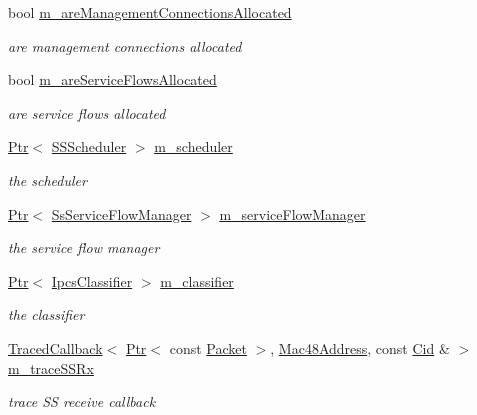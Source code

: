 \begin{DoxyCompactItemize}
bool \hyperlink{classns3_1_1SubscriberStationNetDevice_a601bcf0cd57f6d9f0b112e9c9afc23e7}{m\+\_\+are\+Management\+Connections\+Allocated}
\begin{DoxyCompactList}\small\item\em are management connections allocated \end{DoxyCompactList}\item 
bool \hyperlink{classns3_1_1SubscriberStationNetDevice_aa9526bd72926a0a71e7b066f81de6e22}{m\+\_\+are\+Service\+Flows\+Allocated}
\begin{DoxyCompactList}\small\item\em are service flows allocated \end{DoxyCompactList}\item 
\hyperlink{classns3_1_1Ptr}{Ptr}$<$ \hyperlink{classns3_1_1SSScheduler}{S\+S\+Scheduler} $>$ \hyperlink{classns3_1_1SubscriberStationNetDevice_a38477cd45dd6e6ea0f259ebd33e40e1a}{m\+\_\+scheduler}
\begin{DoxyCompactList}\small\item\em the scheduler \end{DoxyCompactList}\item 
\hyperlink{classns3_1_1Ptr}{Ptr}$<$ \hyperlink{classns3_1_1SsServiceFlowManager}{Ss\+Service\+Flow\+Manager} $>$ \hyperlink{classns3_1_1SubscriberStationNetDevice_ab78972eb8c11e39d3bc119125caadc47}{m\+\_\+service\+Flow\+Manager}
\begin{DoxyCompactList}\small\item\em the service flow manager \end{DoxyCompactList}\item 
\hyperlink{classns3_1_1Ptr}{Ptr}$<$ \hyperlink{classns3_1_1IpcsClassifier}{Ipcs\+Classifier} $>$ \hyperlink{classns3_1_1SubscriberStationNetDevice_a49577de4017dd8cedb2d51dd9de8ff7e}{m\+\_\+classifier}
\begin{DoxyCompactList}\small\item\em the classifier \end{DoxyCompactList}\item 
\hyperlink{classns3_1_1TracedCallback}{Traced\+Callback}$<$ \hyperlink{classns3_1_1Ptr}{Ptr}$<$ const \hyperlink{classns3_1_1Packet}{Packet} $>$, \hyperlink{classns3_1_1Mac48Address}{Mac48\+Address}, const \hyperlink{classns3_1_1Cid}{Cid} \& $>$ \hyperlink{classns3_1_1SubscriberStationNetDevice_aa1771f784eeb694c5ad2035f97ee52e5}{m\+\_\+trace\+S\+S\+Rx}
\begin{DoxyCompactList}\small\item\em trace SS receive callback \end{DoxyCompactList}\item 

\end{DoxyCompactItemize}

